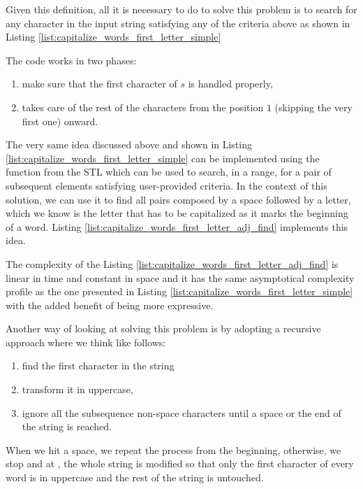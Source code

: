 Given this definition, all it is necessary to do to solve this problem is to search for any character in the input string satisfying any of the criteria above as shown in Listing \ref{list:capitalize_words_first_letter_simple}



The code works in two phases:
\begin{enumerate}
	\item make sure that the first character of $s$ is handled properly,
	\item takes care of the rest of the characters from the position $1$ (skipping the very first one) onward.
\end{enumerate}

The very same idea discussed above and shown in Listing \ref{list:capitalize_words_first_letter_simple} can be implemented using the function \cite{cit::std::adjancefind} from the STL which can be used to search, in a range, for a pair of subsequent elements satisfying  user-provided criteria. In the context of this solution, we can use it to find all pairs composed by a space followed by a letter, which we know is the letter that has to be capitalized as it marks the beginning of a word.
Listing \ref{list:capitalize_words_first_letter_adj_find} implements this idea. 



The complexity of the Listing \ref{list:capitalize_words_first_letter_adj_find}  is linear in time and constant in space and it has the same asymptotical complexity profile as the one presented in Listing \ref{list:capitalize_words_first_letter_simple} with the added benefit of being more expressive.


Another way of looking at solving this problem is by adopting a recursive approach where we think like follows: 
\begin{enumerate}
	\item find the first character in the string 
	\item transform it in uppercase,
	\item ignore all the subsequence non-space characters until a space or the end of the string is reached.
\end{enumerate}
When we hit a space, we repeat the process from the beginning, otherwise, we stop and at , the whole string is modified so that only the first character of every word is in uppercase and the rest of the string is untouched.

